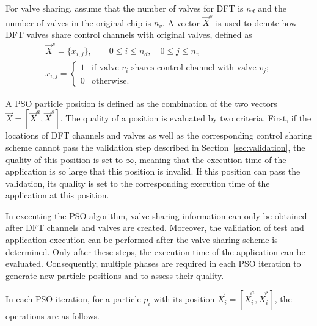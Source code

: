 For valve sharing, assume that the number
of valves for DFT is $n_d$ and the number of valves in the original chip is
$n_v$.  A vector
$\vec{X}^{s}$
is used to denote how DFT valves share control channels with original valves,
defined as
\begin{align}\label{eq:valves_include}
  \vec{X}^{s} =\{x_{i,j}\}, \qquad 0\le i\le n_d, \quad  0\le j\le n_v\\
  x_{i,j}=
  \begin{cases}
    1 & \text{if valve $v_i$ shares control channel with valve $v_j$}; \\
    0 & \text{otherwise.}
  \end{cases}
\end{align}

A PSO particle position is defined as the combination of the two vectors
$\vec{X} = [\vec{X}^{a}, \vec{X}^{s}]$. The quality of a position is evaluated by
two criteria. First, if the locations of DFT channels and valves as well as the
corresponding control sharing scheme cannot pass the validation step described
in Section~\ref{sec:validation}, the quality of this position is set to
$\infty$, meaning that the execution time of the application is so large that
this position is invalid. If this position can pass the validation, its
quality is set to the corresponding execution time of the application at this
position.

In executing the PSO algorithm, valve sharing information can only be obtained
after DFT channels and valves are created. Moreover, the validation of test
and application execution can be performed after the valve sharing scheme is
determined. Only after these steps, the execution time of the application can
be evaluated.  Consequently, multiple phases are required in each PSO
iteration to generate new particle positions and to assess their quality.

In each PSO iteration, for a particle $p_i$ with its position $\vec{X}_i =
[\vec{X}^{a}_i, \vec{X}^{s}_i]$, the operations are as follows. 

